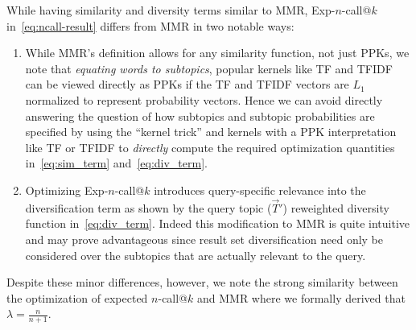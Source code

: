 While having similarity and diversity terms similar to MMR,
Exp-$n$-call@$k$ in~\eqref{eq:ncall-result} differs from MMR
in two notable ways:
\begin{enumerate}
\item While MMR's definition allows for any similarity function, not
  just PPKs, we note that \emph{equating words to subtopics}, popular
  kernels like TF and TFIDF~\cite{salton83Introduction} can be viewed
  directly as PPKs if the TF and TFIDF vectors are $L_1$ normalized to
  represent probability vectors.  Hence we can avoid directly answering the question of how
  subtopics and subtopic probabilities are specified by using the
  ``kernel trick'' and kernels with a PPK interpretation like TF or
  TFIDF to \emph{directly} compute the required optimization quantities
  in~\eqref{eq:sim_term} and~\eqref{eq:div_term}.
\item Optimizing Exp-$n$-call@$k$ introduces query-specific relevance
  into the diversification term as shown by the query topic
  ($\vec{T}'$) reweighted diversity function in~\eqref{eq:div_term}.
  Indeed this modification to MMR is quite intuitive and may prove
  advantageous since result set diversification need only be
  considered over the subtopics that are actually relevant to the
  query.
\end{enumerate}

Despite these minor differences, however, we note the strong similarity
between the optimization of expected $n$-call@$k$ and MMR where we formally
derived that $\lambda = \frac{n}{n+1}$.  

